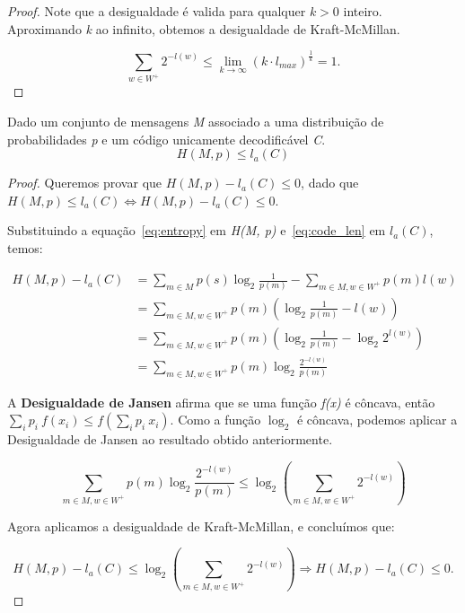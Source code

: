 \begin{lemma}
\begin{proof}
Note que a desigualdade é valida para qualquer $k > 0$ inteiro. Aproximando \emph{k} ao infinito, obtemos a desigualdade de Kraft-McMillan.

\begin{equation*}
\sum_{w \in W^+}^{}2^{-l(w)} \leq \lim_{k\to\infty} (k \cdot l_{max})^ \frac{1}{k} = 1.
\end{equation*}

\end{proof}
\end{lemma}

\begin{lemma} Dado um conjunto de mensagens \emph{M} associado a uma distribuição de probabilidades \emph{p} e um código unicamente decodificável \emph{C}.
\begin{equation*}
H(M, p) \leq l_a(C)
\end{equation*}

\begin{proof}
Queremos provar que $H(M, p) - l_a(C) \leq 0$, dado que  $H(M, p) \leq l_a(C) \Leftrightarrow H(M, p) - l_a(C) \leq 0$.

Substituindo a equação~\ref{eq:entropy} em \emph{H(M, p)} e~\ref{eq:code_len} em \emph{$l_a(C)$}, temos:

\begin{align*}
H(M, p) - l_a(C) &= \sum_{m \in M}^{}p(s) \log_2 \frac{1}{p(m)}  - \sum_{m \in M, w \in W^+}^{}p(m) l(w) \\
&= \sum_{m \in M, w \in W^+}^{}p(m) \left(  \log_2 \frac{1}{p(m)} - l(w) \right) \\
&= \sum_{m \in M, w \in W^+}^{}p(m) \left(  \log_2 \frac{1}{p(m)} - \log_2 2^{l(w)} \right) \\
&= \sum_{m \in M, w \in W^+}^{}p(m) \log_2 \frac{2^{-l(w)}}{p(m)}
\end{align*}

A \textbf{Desigualdade de Jansen} afirma que se uma função \emph{f(x)} é côncava, então $\sum_{i}{}p_i~f(x_i) \leq f(\sum_{i}{}p_i~x_i)$. Como a função $\log_2$ é côncava, podemos aplicar a Desigualdade de Jansen ao resultado obtido anteriormente.

\begin{equation*}
\sum_{m \in M, w \in W^+}^{}p(m) \log_2 \frac{2^{-l(w)}}{p(m)}  \leq \log_2(\sum_{m \in M, w \in W^+}{}2^{-l(w)})
\end{equation*}

Agora aplicamos a desigualdade de Kraft-McMillan, e concluímos que:

\begin{equation*}
H(M, p) - l_a(C) \leq \log_2(\sum_{m \in M, w \in W^+}{}2^{-l(w)}) \Rightarrow H(M, p) - l_a(C) \leq 0.
\end{equation*}


\end{proof}

\end{lemma}

